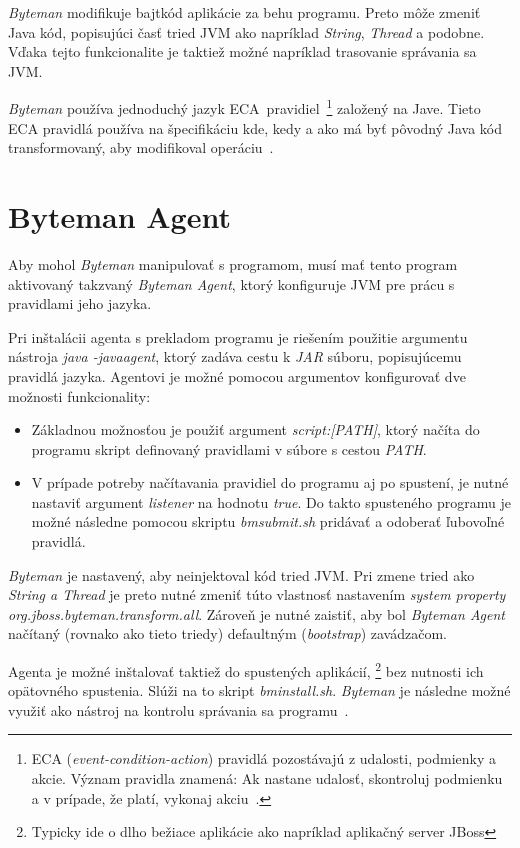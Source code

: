 \documentclass[11pt,final,oneside]{fithesis}
\begin{document}
\textit{Byteman} modifikuje bajtkód aplikácie za behu programu. Preto môže  
zmeniť Java kód, popisujúci časť tried JVM ako napríklad \textit{String},
\textit{Thread} a podobne. Vďaka tejto funkcionalite je taktiež možné
napríklad trasovanie správania sa JVM.

\textit{Byteman} používa jednoduchý jazyk
ECA~pravidiel~\footnote{ECA (\textit{event-condition-action}) pravidlá 
pozostávajú z udalosti, podmienky a akcie. Význam pravidla znamená: Ak nastane 
udalosť, skontroluj podmienku a v prípade, že platí, vykonaj
akciu~\cite{Sellis:ECARules}.} založený na Jave. Tieto ECA pravidlá
používa na špecifikáciu kde, kedy a ako má byť pôvodný Java kód transformovaný,
aby modifikoval operáciu~\cite{RedHat:Byteman}.

\section{Byteman Agent}

Aby mohol \textit{Byteman} manipulovať s programom, musí mať tento program 
aktivovaný takzvaný \textit{Byteman Agent}, ktorý konfiguruje JVM pre prácu s 
pravidlami jeho jazyka.

Pri inštalácii agenta s prekladom programu je riešením použitie argumentu
nástroja \textit{java -javaagent}, ktorý zadáva cestu k \textit{JAR} súboru,
popisujúcemu pravidlá jazyka. Agentovi je možné pomocou argumentov
konfigurovať dve možnosti funkcionality:

\begin{itemize}
\item Základnou možnosťou je použiť argument \textit{script:[PATH]}, ktorý
načíta do programu skript definovaný pravidlami v súbore s cestou
\textit{PATH}.
\item V prípade potreby načítavania pravidiel do programu aj po spustení, je 
nutné nastaviť argument \textit{listener} na hodnotu \textit{true}. Do takto
spusteného programu je možné následne pomocou skriptu \textit{bmsubmit.sh}
pridávať a odoberať ľubovoľné pravidlá.
\end{itemize}

\textit{Byteman} je nastavený, aby neinjektoval kód tried JVM. Pri zmene tried
ako \textit{String a Thread} je preto nutné zmeniť túto vlastnosť
nastavením \textit{system property org.jboss.byteman.transform.all}. Zároveň je
nutné zaistiť, aby bol \textit{Byteman Agent} načítaný (rovnako ako tieto 
triedy) defaultným (\textit{bootstrap}) zavádzačom.

Agenta je možné inštalovať taktiež do spustených aplikácií, \footnote{Typicky
ide o dlho bežiace aplikácie ako napríklad aplikačný server JBoss} bez nutnosti
ich opätovného spustenia. Slúži na to skript \textit{bminstall.sh}.
\textit{Byteman} je následne možné využiť ako nástroj na kontrolu správania sa 
programu~\cite{RedHat:Byteman}. 
\end{document}
